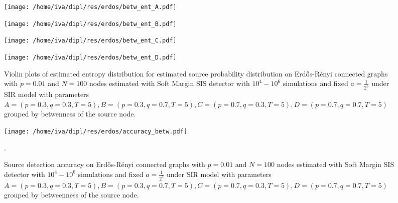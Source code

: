 \documentclass[times, utf8, diplomski]{fer}
\begin{document}
\begin{figure}[H]
\begin{minipage}{\textwidth}
\begin{minipage}{0.48\textwidth}
\texttt{[image: /home/iva/dipl/res/erdos/betw\_ent\_A.pdf]}
\end{minipage}
\begin{minipage}{0.48\textwidth}
\texttt{[image: /home/iva/dipl/res/erdos/betw\_ent\_B.pdf]}
\end{minipage}

\begin{minipage}{0.48\textwidth}
\texttt{[image: /home/iva/dipl/res/erdos/betw\_ent\_C.pdf]}
\end{minipage}
\begin{minipage}{0.48\textwidth}
\texttt{[image: /home/iva/dipl/res/erdos/betw\_ent\_D.pdf]}
\end{minipage}
\caption{Violin plots of estimated entropy distribution for estimated source probability distribution on  Erd{\H{o}}s-R{\'{e}}nyi connected graphs with $p=0.01$ and $N=100$ nodes estimated with Soft Margin SIS detector with $10^4 - 10^6$ simulations and fixed $a = \frac{1}{2^5}$ under SIR model with parameters $A = (p=0.3, q=0.3, T=5), B = (p=0.3, q=0.7, T=5), C = (p=0.7, q=0.3, T=5), D = (p=0.7, q=0.7, T=5)$ grouped by betwenness of the source node.}
\label{betw_ent}
\end{minipage}

\begin{minipage}{\textwidth}
\center
\texttt{[image: /home/iva/dipl/res/erdos/accuracy\_betw.pdf]}
\caption{Source detection accuracy on  Erd{\H{o}}s-R{\'{e}}nyi connected graphs with $p=0.01$ and $N=
100$ nodes estimated with Soft Margin SIS detector with $10^4 - 10^6$ simulations and fixed $a = \frac{1}{2^5}$ under SIR model with parameters $A = (p=0.3, q=0.3, T=5), B = (p=0.3, q=0.7, T=5), C = (p=0.7, q=0.3, T=5), D = (p=0.7, q=0.7, T=5)$ grouped by betweenness of the source node.}.
\label{accuracy_betw}
\end{minipage}
\end{figure}
\end{document}
